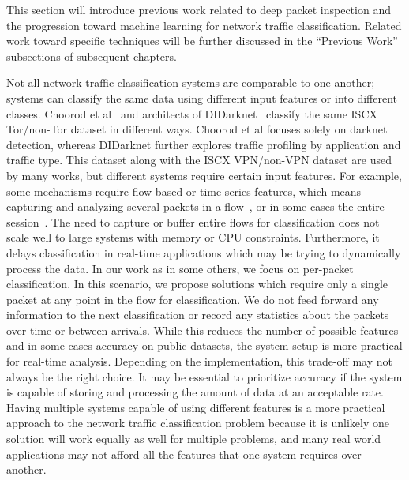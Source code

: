This section will introduce previous work related to deep packet inspection and the progression toward  machine learning for network traffic classification. Related work toward specific techniques will be further discussed in the ``Previous Work'' subsections of subsequent chapters.


Not all network traffic classification systems are comparable to one another; systems can classify the same data using different input features or into different classes. Choorod et al~\cite{choorod2022tor} and architects of DIDarknet~\cite{didarknet} classify the same ISCX Tor/non-Tor dataset in different ways. Choorod et al focuses solely on darknet detection, whereas DIDarknet further explores traffic profiling by application and traffic type. This dataset along with the ISCX VPN/non-VPN dataset are used by many works, but different systems require certain input features. For example, some mechanisms require flow-based or time-series features, which means capturing and analyzing several packets in a flow~\cite{onlyheader, zhou2018encrypted}, or in some cases the entire session~\cite{perera2017comparison, deeppacket, panchenko2011website, amaral2016machine, cao2014survey, ibrahim2016internet, fan2017investigation, sun2018internet, iscx-tor-paper, iscx-vpn-paper}. The need to capture or buffer entire flows for classification does not scale well to large systems with memory or CPU constraints. Furthermore, it delays classification in real-time applications which may be trying to dynamically process the data. In our work as in some others, we focus on per-packet classification. In this scenario, we propose solutions which require only a single packet at any point in the flow for classification. We do not feed forward any information to the next classification or record any statistics about the packets over time or between arrivals. While this reduces the number of possible features and in some cases accuracy on public datasets, the system setup is more practical for real-time analysis. Depending on the implementation, this trade-off may not always be the right choice. It may be essential to prioritize accuracy if the system is capable of storing and processing the amount of data at an acceptable rate. Having multiple systems capable of using different features is a more practical approach to the network traffic classification problem because it is unlikely one solution will work equally as well for multiple problems, and many real world applications may not afford all the features that one system requires over another.

